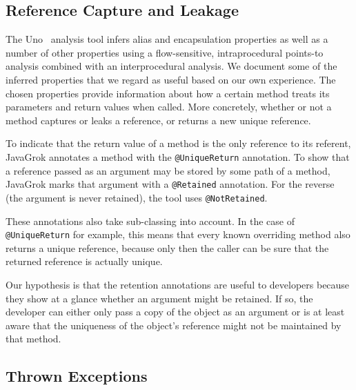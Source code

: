 

\subsection{Reference Capture and Leakage}

The Uno~\cite{Uno} analysis tool infers alias and encapsulation properties as well as a number
of other properties using a flow-sensitive,
intraprocedural points-to analysis combined with an interprocedural analysis.
We document some of the inferred properties that we regard as useful
based on our own experience. The chosen properties 
provide information about how a certain method treats its parameters and 
return values when called. More concretely, whether or not a 
method captures or leaks a reference, or returns a new unique reference.

To indicate that the return value of a method is the only reference to its
referent, JavaGrok annotates a method with the \texttt{@UniqueReturn}
annotation.  To show that a reference passed as an argument may be stored by
some path of a method, JavaGrok marks that argument with a \texttt{@Retained}
annotation.  For the reverse (the argument is never retained), the tool uses
\texttt{@NotRetained}.

These annotations also take sub-classing into account. In the case of
\texttt{@UniqueReturn} for example, this means that every known overriding method
also returns a unique reference, because only then the caller can be sure
that the returned reference is actually unique.

Our hypothesis is that the retention annotations are useful to developers
because they show at a glance whether an argument
might be retained. If so, the developer can either only
pass a copy of the object as an argument or is at least aware that the uniqueness
of the object's reference might not be maintained by that method.

\subsection{Thrown Exceptions}

